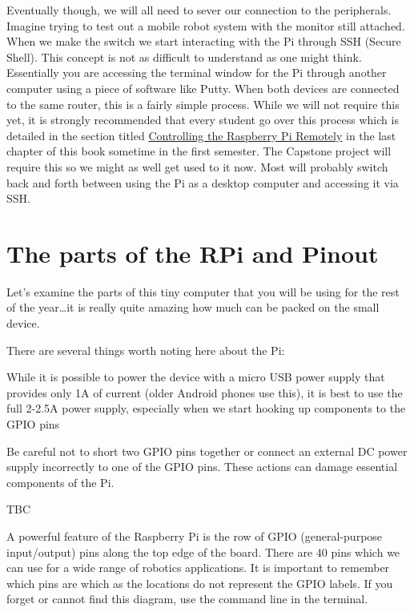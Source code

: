 \documentclass[
]{book}
\begin{document}
Eventually though, we will all need to sever our connection to the peripherals. Imagine trying to test out a mobile robot system with the monitor still attached. When we make the switch we start interacting with the Pi through SSH (Secure Shell). This concept is not as difficult to understand as one might think. Essentially you are accessing the terminal window for the Pi through another computer using a piece of software like Putty. When both devices are connected to the same router, this is a fairly simple process. While we will not require this yet, it is strongly recommended that every student go over this process which is detailed in the section titled \protect\hyperlink{controlling-the-raspberry-pi-remotely}{Controlling the Raspberry Pi Remotely} in the last chapter of this book sometime in the first semester. The Capstone project will require this so we might as well get used to it now. Most will probably switch back and forth between using the Pi as a desktop computer and accessing it via SSH.

\hypertarget{the-parts-of-the-rpi-and-pinout}{%
\section{The parts of the RPi and Pinout}\label{the-parts-of-the-rpi-and-pinout}}

Let's examine the parts of this tiny computer that you will be using for the rest of the year\ldots it is really quite amazing how much can be packed on the small device.

There are several things worth noting here about the Pi:

While it is possible to power the device with a micro USB power supply that provides only 1A of current (older Android phones use this), it is best to use the full 2-2.5A power supply, especially when we start hooking up components to the GPIO pins

Be careful not to short two GPIO pins together or connect an external DC power supply incorrectly to one of the GPIO pins. These actions can damage essential components of the Pi.

TBC

A powerful feature of the Raspberry Pi is the row of GPIO (general-purpose input/output) pins along the top edge of the board. There are 40 pins which we can use for a wide range of robotics applications.
It is important to remember which pins are which as the locations do not represent the GPIO labels. If you forget or cannot find this diagram, use the command line in the terminal.
\end{document}
